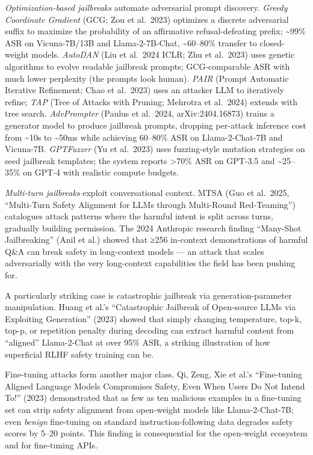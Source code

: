 \emph{Optimization-based jailbreaks} automate adversarial prompt discovery. \emph{Greedy Coordinate Gradient} (GCG; Zou et al.~2023) optimizes a discrete adversarial suffix to maximize the probability of an affirmative refusal-defeating prefix; \textasciitilde99\% ASR on Vicuna-7B/13B and Llama-2-7B-Chat, \textasciitilde60--80\% transfer to closed-weight models. \emph{AutoDAN} (Liu et al.~2024 ICLR; Zhu et al.~2023) uses genetic algorithms to evolve readable jailbreak prompts; GCG-comparable ASR with much lower perplexity (the prompts look human). \emph{PAIR} (Prompt Automatic Iterative Refinement; Chao et al.~2023) uses an attacker LLM to iteratively refine; \emph{TAP} (Tree of Attacks with Pruning; Mehrotra et al.~2024) extends with tree search. \emph{AdvPrompter} (Paulus et al.~2024, arXiv:2404.16873) trains a generator model to produce jailbreak prompts, dropping per-attack inference cost from \textasciitilde10s to \textasciitilde50ms while achieving 60--80\% ASR on Llama-2-Chat-7B and Vicuna-7B. \emph{GPTFuzzer} (Yu et al.~2023) uses fuzzing-style mutation strategies on seed jailbreak templates; the system reports \textgreater70\% ASR on GPT-3.5 and \textasciitilde25--35\% on GPT-4 with realistic compute budgets.

\emph{Multi-turn jailbreaks} exploit conversational context. MTSA (Guo et al.~2025, ``Multi-Turn Safety Alignment for LLMs through Multi-Round Red-Teaming'') catalogues attack patterns where the harmful intent is split across turns, gradually building permission. The 2024 Anthropic research finding ``Many-Shot Jailbreaking'' (Anil et al.) showed that ≥256 in-context demonstrations of harmful Q\&A can break safety in long-context models --- an attack that scales adversarially with the very long-context capabilities the field has been pushing for.

A particularly striking case is catastrophic jailbreak via generation-parameter manipulation. Huang et al.'s ``Catastrophic Jailbreak of Open-source LLMs via Exploiting Generation'' (2023) showed that simply changing temperature, top-k, top-p, or repetition penalty during decoding can extract harmful content from ``aligned'' Llama-2-Chat at over 95\% ASR, a striking illustration of how superficial RLHF safety training can be.

Fine-tuning attacks form another major class. Qi, Zeng, Xie et al.'s ``Fine-tuning Aligned Language Models Compromises Safety, Even When Users Do Not Intend To!'' (2023) demonstrated that as few as ten malicious examples in a fine-tuning set can strip safety alignment from open-weight models like Llama-2-Chat-7B; even \emph{benign} fine-tuning on standard instruction-following data degrades safety scores by 5--20 points. This finding is consequential for the open-weight ecosystem and for fine-tuning APIs.

